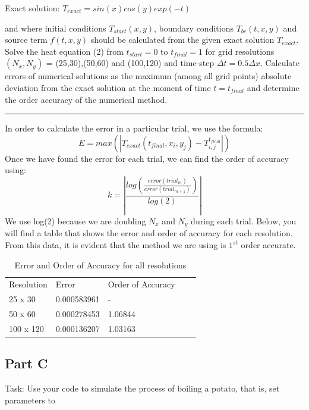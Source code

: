\documentclass[12pt]{article}
\begin{document}
\hspace{3cm}Exact solution: \hspace{2cm} $T_{exact} = sin(x)cos(y)exp(-t)$

\noindent and where initial conditions $T_{start}(x,y)$, boundary conditions $T_{bc}(t,x,y)$ and source term $f(t,x,y)$ should be calculated from the given exact solution $T_{exact}$. Solve the heat equation (2) from $t_{start} = 0$ to $t_{final} = 1$ for grid resolutions $(N_x, N_y)$ = (25,30),(50,60) and (100,120) and time-step $\Delta t = 0.5\Delta x$. Calculate errors of numerical solutions as the maximum (among all grid points) absolute deviation from the exact solution at the moment of time $t = t_{final}$ and determine the order accuracy of the numerical method.
\begin{center}
\rule{10cm}{0.4pt}
\end{center}

In order to calculate the error in a particular trial, we use the formula:
\begin{equation*}
E = max(|T_{exact}(t_{final},x_i,y_j) - T_{i,j}^{t_{final}}|)
\end{equation*}
Once we have found the error for each trial, we can find the order of accuracy using:
\begin{equation*}
k = \left|\frac{log\left(\frac{error(trial_m)}{error(trial_{m+1})}\right)}{log(2)}\right|
\end{equation*}
We use log(2) because we are doubling $N_x$ and $N_y$ during each trial. Below, you will find a table that shows the error and order of accuracy for each resolution. From this data, it is evident that the method we are using is $1^{st}$ order accurate.
\begin{table}[htb]
\centering
\label{p1_table}
\begin{tabular}{|l|l|l|ll}
\cline{1-3}
Resolution & Error       & Order of Accuracy &  &  \\ \cline{1-3}
25 x 30    & 0.000583961 & -                 &  &  \\ \cline{1-3}
50 x 60    & 0.000278453 & 1.06844           &  &  \\ \cline{1-3}
100 x 120  & 0.000136207 & 1.03163           &  &  \\ \cline{1-3}
\end{tabular}
\caption {Error and Order of Accuracy for all resolutions}
\end{table}
\subsection*{Part C}
Task: Use your code to simulate the process of boiling a potato, that is, set parameters to
\\
\end{document}
